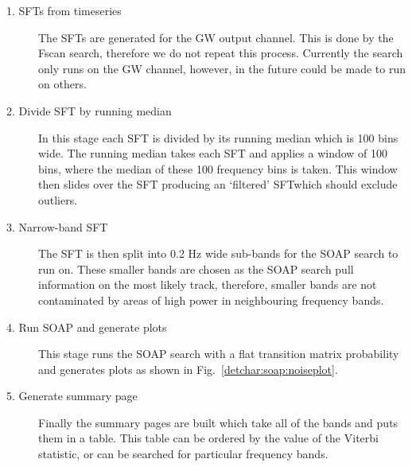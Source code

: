 \begin{description}
	\item[1. \glspl{SFT} from timeseries] The \glspl{SFT} are generated for the \gls{GW} output channel. This is done by the Fscan search, therefore we do not repeat this process. Currently the search only runs on the \gls{GW} channel, however, in the future could be made to run on others.
	
	\item[2. Divide \gls{SFT} by running median] In this stage each \gls{SFT} is divided by its running median which is 100 bins wide. The running median takes each \gls{SFT} and applies a window of 100 bins, where the median of these 100 frequency bins is taken. This window then slides over the \gls{SFT} producing an `filtered' \gls{SFT}which should exclude outliers.
	
	\item[3. Narrow-band \gls{SFT}] The \gls{SFT} is then split into 0.2 Hz wide sub-bands for the SOAP search to run on. These smaller bands are chosen as the SOAP search pull information on the most likely track, therefore, smaller bands are not contaminated by areas of high power in neighbouring frequency bands. 
	
	\item[4. Run SOAP and generate plots] This stage runs the SOAP search with a flat transition matrix probability and generates plots as shown in Fig.~\ref{detchar:soap:noiseplot}.
	
	\item[5. Generate summary page] Finally the summary pages are built which take all of the bands and puts them in a table. This table can be ordered by the value of the Viterbi statistic, or can be searched for particular frequency bands. 
\end{description}

